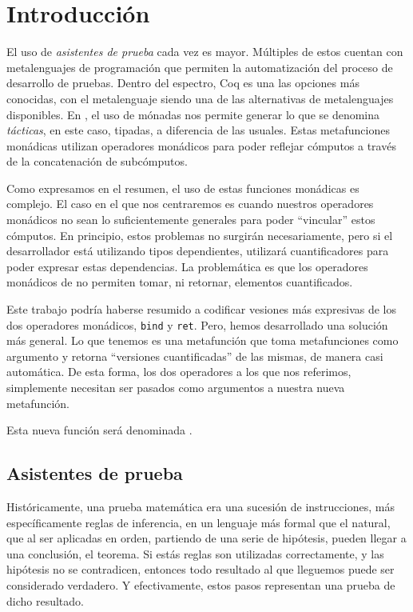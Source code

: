 \chapter{Introducción}\label{ch:intro}

El uso de \emph{asistentes de prueba} cada vez es mayor.
Múltiples de estos cuentan con metalenguajes de programación que permiten la automatización del proceso de desarrollo de pruebas.
Dentro del espectro, Coq \cite{CIC} es una las opciones más conocidas, con el metalenguaje \mtac \cite{DBLP:journals/pacmpl/KaiserZKRD18} siendo una de las alternativas de metalenguajes disponibles.
En \Mtac, el uso de mónadas nos permite generar lo que se denomina \emph{tácticas}, en este caso, tipadas, a diferencia de las usuales.
Estas metafunciones monádicas utilizan operadores monádicos para poder reflejar cómputos a través de la concatenación de subcómputos.

Como expresamos en el resumen, el uso de estas funciones monádicas es complejo.
El caso en el que nos centraremos es cuando nuestros operadores monádicos no sean lo suficientemente generales para poder ``vincular'' estos cómputos.
En principio, estos problemas no surgirán necesariamente, pero si el desarrollador está utilizando tipos dependientes, utilizará cuantificadores para poder expresar estas dependencias. La problemática es que los operadores monádicos de \mtac no permiten tomar, ni retornar, elementos cuantificados.

Este trabajo podría haberse resumido a codificar vesiones más expresivas de los dos operadores monádicos, \lstinline{bind} y \lstinline{ret}.
Pero, hemos desarrollado una solución más general.
Lo que tenemos es una metafunción que toma metafunciones como argumento y retorna ``versiones cuantificadas'' de las mismas, de manera casi automática.
De esta forma, los dos operadores a los que nos referimos, simplemente necesitan ser pasados como argumentos a nuestra nueva metafunción.

Esta nueva función será denominada \lift.

\section{Asistentes de prueba}

Históricamente, una prueba matemática era una sucesión de instrucciones, más específicamente reglas de inferencia, en un lenguaje más formal que el natural, que al ser aplicadas en orden, partiendo de una serie de hipótesis, pueden llegar a una conclusión, el teorema.
Si estás reglas son utilizadas correctamente, y las hipótesis no se contradicen, entonces todo resultado al que lleguemos puede ser considerado verdadero. Y efectivamente, estos pasos representan una prueba de dicho resultado.

